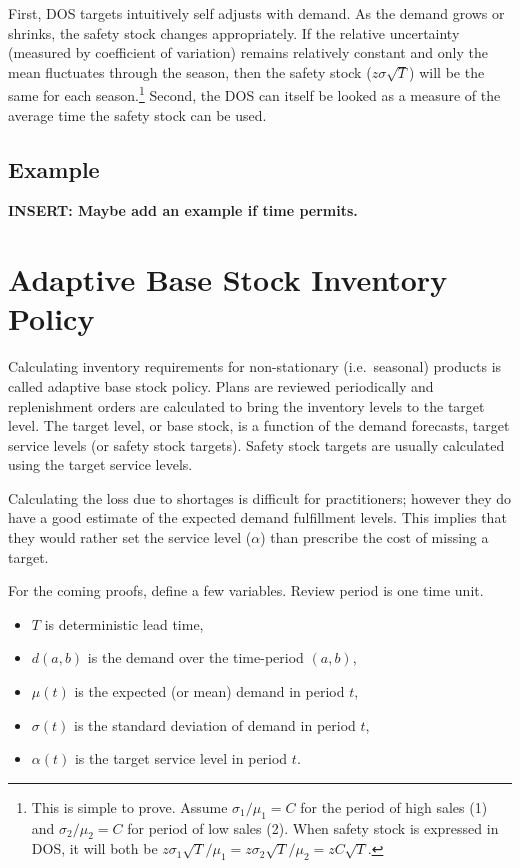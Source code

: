 \documentclass[,msom,nonblindrev]{informs}
\begin{document}
First, DOS targets intuitively self adjusts with demand. As the demand
grows or shrinks, the safety stock changes appropriately. If the
relative uncertainty (measured by coefficient of variation) remains
relatively constant and only the mean fluctuates through the season,
then the safety stock (\(z\sigma\sqrt{T}\)) will be the same for each
season.\footnote{This is simple to prove. Assume \(\sigma_1/\mu_1 = C\)
  for the period of high sales (1) and \(\sigma_2/\mu_2 = C\) for period
  of low sales (2). When safety stock is expressed in DOS, it will both
  be
  \(z \sigma_1 \sqrt{T} / \mu_1 = z \sigma_2 \sqrt{T} / \mu_2 = z C \sqrt{T}\).}
Second, the DOS can itself be looked as a measure of the average time
the safety stock can be used.

\hypertarget{example}{%
\subsection{Example}\label{example}}

\textbf{INSERT: Maybe add an example if time permits.}

\hypertarget{adaptive-base-stock-inventory-policy}{%
\section{Adaptive Base Stock Inventory
Policy}\label{adaptive-base-stock-inventory-policy}}

Calculating inventory requirements for non-stationary (i.e.~seasonal)
products is called adaptive base stock policy. Plans are reviewed
periodically and replenishment orders are calculated to bring the
inventory levels to the target level. The target level, or base stock,
is a function of the demand forecasts, target service levels (or safety
stock targets). Safety stock targets are usually calculated using the
target service levels.

Calculating the loss due to shortages is difficult for practitioners;
however they do have a good estimate of the expected demand fulfillment
levels. This implies that they would rather set the service level
(\(\alpha\)) than prescribe the cost of missing a target.

For the coming proofs, \citet{neale2014} define a few variables. Review
period is one time unit.

\begin{itemize}
\item
  \(T\) is deterministic lead time,
\item
  \(d(a, b)\) is the demand over the time-period \((a, b)\),
\item
  \(\mu(t)\) is the expected (or mean) demand in period \(t\),
\item
  \(\sigma(t)\) is the standard deviation of demand in period \(t\),
\item
  \(\alpha(t)\) is the target service level in period \(t\).
\end{itemize}
\end{document}
